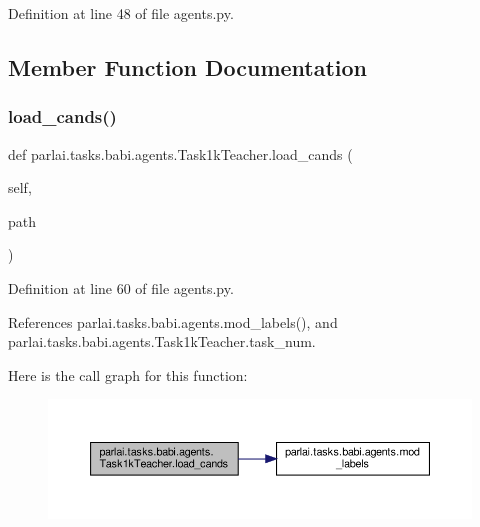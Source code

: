 Definition at line 48 of file agents.\+py.



\subsection{Member Function Documentation}
\mbox{\label{classparlai_1_1tasks_1_1babi_1_1agents_1_1Task1kTeacher_a23edda520c74d1b34de50e3c8994c2f1}} 
\subsubsection{\texorpdfstring{load\+\_\+cands()}{load\_cands()}}
{\footnotesize\ttfamily def parlai.\+tasks.\+babi.\+agents.\+Task1k\+Teacher.\+load\+\_\+cands (\begin{DoxyParamCaption}\item[{}]{self,  }\item[{}]{path }\end{DoxyParamCaption})}



Definition at line 60 of file agents.\+py.



References parlai.\+tasks.\+babi.\+agents.\+mod\+\_\+labels(), and parlai.\+tasks.\+babi.\+agents.\+Task1k\+Teacher.\+task\+\_\+num.

Here is the call graph for this function\+:
\nopagebreak
\begin{figure}[H]
\begin{center}
\leavevmode
\includegraphics[width=350pt]{classparlai_1_1tasks_1_1babi_1_1agents_1_1Task1kTeacher_a23edda520c74d1b34de50e3c8994c2f1_cgraph}
\end{center}
\end{figure}
\mbox{\label{classparlai_1_1tasks_1_1babi_1_1agents_1_1Task1kTeacher_a191f80b829fd3103238317eed2cad03e}} 
